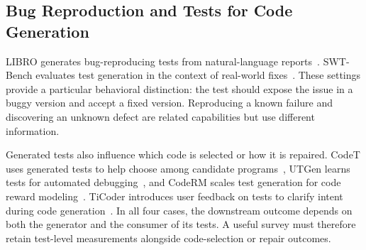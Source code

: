 \subsection{Bug Reproduction and Tests for Code Generation}
LIBRO generates bug-reproducing tests from natural-language reports~\cite{G01}. SWT-Bench evaluates test generation in the context of real-world fixes~\cite{B03}. These settings provide a particular behavioral distinction: the test should expose the issue in a buggy version and accept a fixed version. Reproducing a known failure and discovering an unknown defect are related capabilities but use different information.

Generated tests also influence which code is selected or how it is repaired. CodeT uses generated tests to help choose among candidate programs~\cite{T10}, UTGen learns tests for automated debugging~\cite{T05}, and CodeRM scales test generation for code reward modeling~\cite{T06}. TiCoder introduces user feedback on tests to clarify intent during code generation~\cite{T11}. In all four cases, the downstream outcome depends on both the generator and the consumer of its tests. A useful survey must therefore retain test-level measurements alongside code-selection or repair outcomes.
